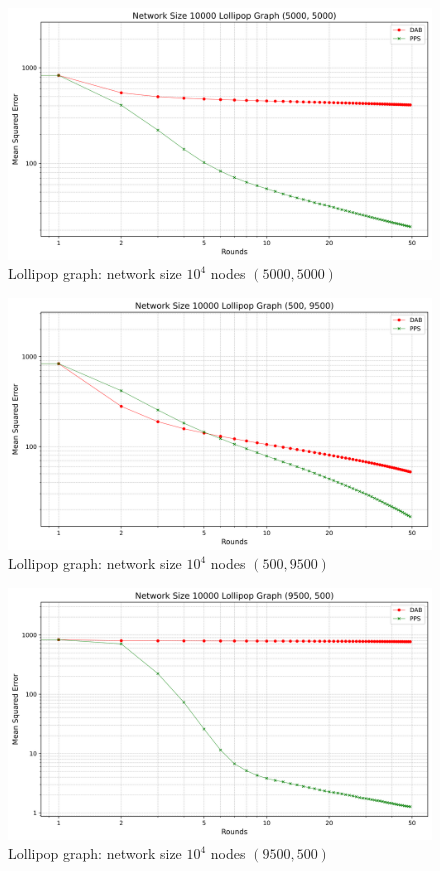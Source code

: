 \begin{figure}[H]
    \centering
    \includegraphics[scale=0.5]{figures/lollipopGraphSimulations/5000+5000/DAB_vs_PPS_LG_r50_n10000.png}
    \caption{Lollipop graph: network size $10^{4}$ nodes $(5000, 5000)$}
    \label{fig:5000+5000lollipopgraph}
\end{figure}
\begin{figure}[H]
    \centering
    \includegraphics[scale=0.5]{figures/lollipopGraphSimulations/500+9500/DAB_vs_PPS_LG_r50_n10000.png}
    \caption{Lollipop graph: network size $10^{4}$ nodes $(500, 9500)$}
    \label{fig:500+9500lollipopgraph}
\end{figure}
\begin{figure}[H]
    \centering
    \includegraphics[scale=0.5]{figures/lollipopGraphSimulations/9500+500/DAB_vs_PPS_LG_r50_n10000.png}
    \caption{Lollipop graph: network size $10^{4}$ nodes $(9500, 500)$}
    \label{fig:9500+500lollipopgraph}
\end{figure}